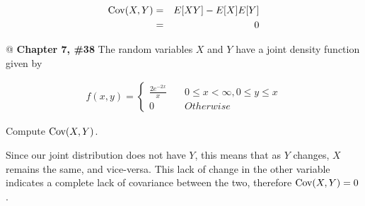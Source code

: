 \documentclass[11pt]{article}\usepackage[]{graphicx}\usepackage[]{xcolor}
\begin{document}
\begin{easylist}[enumerate]
    \begin{equation*}
        \begin{aligned}
            \text{Cov}(X, Y) &=& E[XY] - E[X]E[Y]\\
            &=& 0
        \end{aligned}
    \end{equation*}

    @ \textbf{Chapter 7, \#38} The random variables $X$ and $Y$ have a joint density function given by

    \begin{equation*}
        \begin{aligned}
            f(x, y) =
            \begin{cases}
                \frac{2 e^{-2x}}{x} &\quad 0 \le x < \infty, 0 \le y \le x\\
                0 &\quad Otherwise
            \end{cases}
        \end{aligned}
    \end{equation*}

    Compute $\text{Cov}(X, Y)$.\newline

    Since our joint distribution does not have $Y$, this means that as $Y$ changes, $X$ remains the same, and
    vice-versa. This lack of change in the other variable indicates a complete lack of covariance between the two,
    therefore $\text{Cov}(X, Y) = 0$.

\end{easylist}
\end{document}

